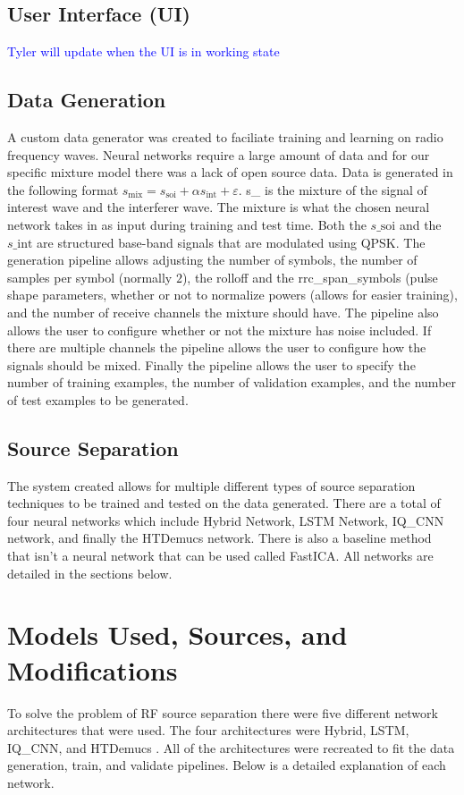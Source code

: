 \documentclass[conference]{IEEEtran}
\begin{document}
\subsection{User Interface (UI)}
\textcolor{blue}{Tyler will update when the UI is in working state}

\subsection{Data Generation}
A custom data generator was created to faciliate training and learning on radio frequency waves. Neural networks require a large amount of data and for our specific mixture model there was a lack of open source data. Data is generated in the following format $s_{\text{mix}} = s_{\text{soi}} + \alpha s_{\text{int}} + \varepsilon$. s\_ is the mixture of the signal of interest wave and the interferer wave. The mixture is what the chosen neural network takes in as input during training and test time. Both the $s\_{\text{soi}}$ and the $s\_{\text{int}}$ are structured base-band signals that are modulated using QPSK. The generation pipeline allows adjusting the number of symbols, the number of samples per symbol (normally $2$), the rolloff and the rrc\_span\_symbols (pulse shape parameters, whether or not to normalize powers (allows for easier training), and the number of receive channels the mixture should have. The pipeline also allows the user to configure whether or not the mixture has noise included. If there are multiple channels the pipeline allows the user to configure how the signals should be mixed. Finally the pipeline allows the user to specify the number of training examples, the number of validation examples, and the number of test examples to be generated.

\subsection{Source Separation}
The system created allows for multiple different types of source separation techniques to be trained and tested on the data generated. There are a total of four neural networks which include Hybrid Network, LSTM Network, IQ\_CNN network, and finally the HTDemucs network. There is also a baseline method that isn't a neural network that can be used called FastICA. All networks are detailed in the sections below.

\section{Models Used, Sources, and Modifications}
To solve the problem of RF source separation there were five different network architectures that were used. The four architectures were Hybrid, LSTM, IQ\_CNN, and HTDemucs \cite{demucs_github}. All of the architectures were recreated to fit the data generation, train, and validate pipelines. Below is a detailed explanation of each network.
\end{document}
